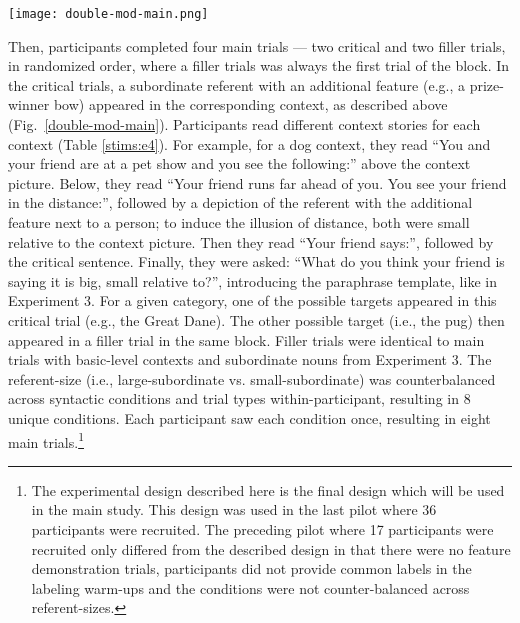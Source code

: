 \begin{figure*}[t]
	\begin{center}
		\texttt{[image: double-mod-main.png]}
	\end{center}
	\vspace{-0.3cm}
	\caption{Example critical main trial in Experiment 4: Participants see a dog-context and read the corresponding cover story. The small-subordinate referent is described by a predicate-noun sentence.}
	\label{double-mod-main}
\end{figure*} 
Then, participants completed four main trials --- two critical and two filler trials, in randomized order, where a filler trials was always the first trial of the block. In the critical trials, a subordinate referent with an additional feature (e.g., a prize-winner bow) appeared in the corresponding context, as described above (Fig.~\ref{double-mod-main}). Participants read different context stories for each context (Table \ref{stims:e4}).  For example, for a dog context, they read “You and your friend are at a pet show and you see the following:” above the context picture. Below, they read “Your friend runs far ahead of you. You see your friend in the distance:”, followed by a depiction of the referent with the additional feature next to a person; to induce the illusion of distance, both were small relative to the context picture. Then they read “Your friend says:”, followed by the critical sentence. Finally, they were asked: “What do you think your friend is saying it is {big, small} relative to?”, introducing the paraphrase template, like in Experiment 3. For a given category, one of the possible targets appeared in this critical trial (e.g., the Great Dane). The other possible target (i.e., the pug) then appeared in a filler trial in the same block. Filler trials were identical to main trials with basic-level contexts and subordinate nouns from Experiment 3. The referent-size (i.e., large-subordinate vs. small-subordinate) was counterbalanced across syntactic conditions and trial types within-participant, resulting in 8 unique conditions. Each participant saw each condition once, resulting in eight main trials.\footnote{The experimental design described here is the final design which will be used in the main study. This design was used in the last pilot where 36 participants were recruited. The preceding pilot where 17 participants were recruited only differed from the described design in that there were no feature demonstration trials, participants did not provide common labels in the labeling warm-ups and the conditions were not counter-balanced across referent-sizes.}

